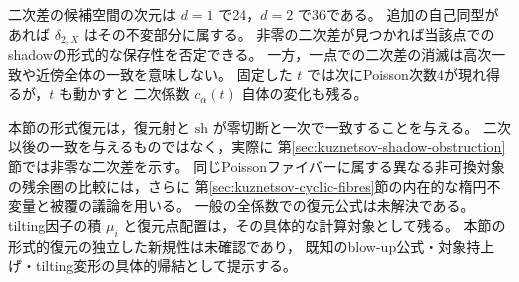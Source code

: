 \begin{remark}[二次比較の限界]
二次差の候補空間の次元は $d=1$ で24，$d=2$ で36である。
追加の自己同型があれば $\delta_{2,X}$ はその不変部分に属する。
非零の二次差が見つかれば当該点でのshadowの形式的な保存性を否定できる。
一方，一点での二次差の消滅は高次一致や近傍全体の一致を意味しない。
固定した $t$ では次にPoisson次数4が現れ得るが，$t$ も動かすと
二次係数 $c_\alpha(t)$ 自体の変化も残る。
\end{remark}

\begin{remark}[形式復元と後続の比較]
本節の形式復元は，復元射と $\mathrm{sh}$ が零切断と一次で一致することを与える。
二次以後の一致を与えるものではなく，実際に
第\ref{sec:kuznetsov-shadow-obstruction}節では非零な二次差を示す。
同じPoissonファイバーに属する異なる非可換対象の残余圏の比較には，さらに
第\ref{sec:kuznetsov-cyclic-fibres}節の内在的な楕円不変量と被覆の議論を用いる。
一般の全係数での復元公式は未解決である。
tilting因子の積 $\mu_i$ と復元点配置は，その具体的な計算対象として残る。
本節の形式的復元の独立した新規性は未確認であり，
既知のblow-up公式・対象持上げ・tilting変形の具体的帰結として提示する。
\end{remark}
